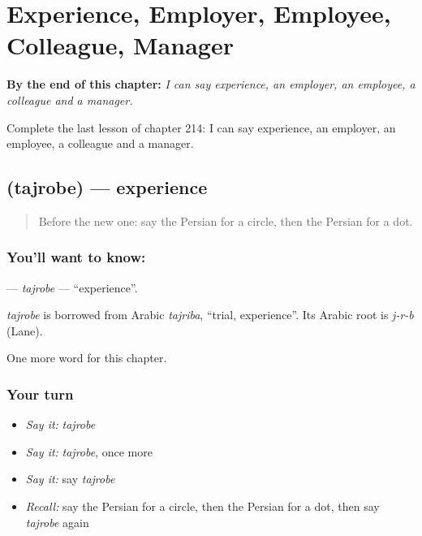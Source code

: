 
\chapter{Experience, Employer, Employee, Colleague, Manager}
\label{ch:fa-experience-employer-employee-colleague-manager}

\begin{chapteropening}
\textbf{By the end of this chapter:} \emph{I can say experience, an employer, an employee, a colleague and a manager.}

Complete the last lesson of chapter 214: I can say experience, an employer, an employee, a colleague and a manager.
\end{chapteropening}

\section[\texorpdfstring{\fa{تجربه} (tajrobe)}{تجربه (tajrobe)}]{ (tajrobe) — experience}

\label{lesson:FA-C214-tajrobe}



\begin{quote}
Before the new one: say the Persian for a circle, then the Persian for a dot.
\end{quote}

\subsection*{You'll want to know: }
\textbf{} — \emph{tajrobe} — \textquotedblleft{}experience\textquotedblright{}.

\begin{cousinweb}
\emph{tajrobe} is borrowed from Arabic \emph{tajriba}, \textquotedblleft{}trial, experience\textquotedblright{}. Its Arabic root is \emph{j-r-b} (Lane).
\end{cousinweb}

\begin{grammarlens}[title={What you've built}]
One more word for this chapter.
\end{grammarlens}

\subsection*{Your turn}
\begin{itemize}
\raggedright
  \item \emph{Say it:} \emph{tajrobe}
  \item \emph{Say it:} \emph{tajrobe}, once more
  \item \emph{Say it:} say \emph{tajrobe}
  \item \emph{Recall:} say the Persian for a circle, then the Persian for a dot, then say \emph{tajrobe} again
\end{itemize}

